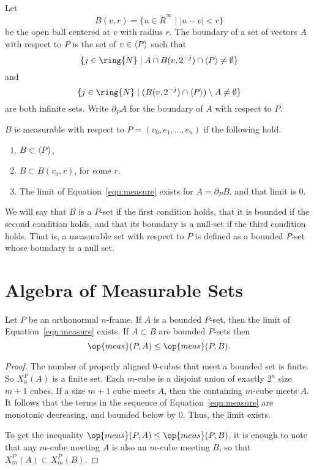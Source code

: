 \begin{definition}
    Let $$B(v,r) = \{u\in \ring{R}^\infty\mid |u - v|< r\}$$ be
    the open ball centered at $v$ with radius $r$.
    The boundary of a set of vectors $A$ with respect to $P$ is the set of
    $v\in {\langle P\rangle}$ such that
        $$\{j\in\ring{N}\mid A \cap B(v,2^{-j})\cap\aspan{P}\ne\emptyset\}$$
    and
        $$\{j\in\ring{N}\mid (B(v,2^{-j})\cap\aspan{P})\setminus A\ne\emptyset\}$$
    are both infinite sets.
    Write $\partial_P A$ for the
    boundary of $A$ with respect to $P$.
\end{definition}

\begin{definition} \label{def:measurable}
    $B$ is measurable with respect to $P=(v_0,e_1,\ldots,e_n)$
    if the following hold.
    \begin{enumerate}
    \item $B \subset {\langle P\rangle}$,
    \item $B \subset B(v_0,r)$, for some $r$.
    \item The limit of Equation~\ref{eqn:measure} exists for $A = \partial_P B$,
    and that limit is $0$.
    \end{enumerate}
\end{definition}

We will say that $B$ is a $P$-set if the first condition holds, that
it is bounded if the second condition holds, and that its boundary
is a null-set if the third condition holds.   That is, a measurable
set with respect to $P$ is defined as a bounded $P$-set whose
boundary is a null set.


\section{Algebra of Measurable Sets}

\begin{lemma}\label{lemma:meas-le}
    Let $P$ be an orthonormal $n$-frame.
    If $A$ is a bounded $P$-set, then the limit of Equation~\ref{eqn:measure}
    exists.  If $A\subset B$ are bounded $P$-sets then
    $$\op{meas}(P,A)\le \op{meas}(P,B).$$
\end{lemma}

\begin{proof}  The number of properly aligned $0$-cubes that meet a
bounded set is finite.  So $X^P_0(A)$ is a finite set.  Each
$m$-cube is a disjoint union of exactly $2^n$ size $m+1$ cubes. If a
size $m+1$ cube meets $A$, then the containing $m$-cube meets $A$.
It follows that the terms in the sequence of
Equation~\ref{eqn:measure} are monotonic decreasing, and bounded
below by $0$.  Thus, the limit exists.

To get the inequality $\op{meas}(P,A)\le \op{meas}(P,B)$, it is
enough to note that any $m$-cube meeting $A$ is also an $m$-cube
meeting $B$, so that $X^P_m(A) \subset X^P_m(B)$.
\end{proof}

